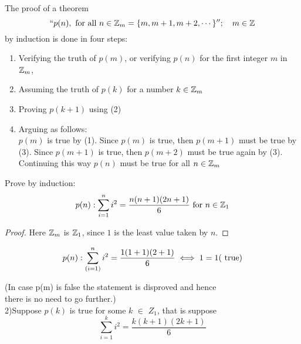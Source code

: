 \documentclass[11pt]{amsbook}
\begin{document}

The proof of a theorem
\[
	``p(n), 
	\text{ for all } 
	n \in \mathbb{Z}_{m} = \{ m, m + 1, m + 2, \cdots \}''; 
	\quad
	m \in \mathbb{Z}
\]
by induction is done in four steps:
\begin{enumerate}

	\item 
	Verifying the truth of $p(m)$, 
	or verifying $p(n)$ for the first integer $m$ in $\mathbb{Z}_{m}$,

	\item 
	Assuming the truth of $p(k)$ for a number $k \in \mathbb{Z}_{m}$

	\item 
	Proving $p(k+1)$ using (2)

	\item 
	Arguing as follows:\\
	$p(m)$ is true by (1).
	Since $p(m)$ is true, 
	then $p(m+1)$ must be true by (3).
	Since $p(m+1)$ is true, 
	then $p(m+2)$ must be true again by (3).
	Continuing this way $p(n)$ must be true for all $n \in \mathbb{Z}_{m}$
\end{enumerate}

\begin{exmp} 
	Prove by induction:
	\[
		p(n): 
		\sum_{i = 1}^{n} i^{2}
		= \frac{n(n+1)(2n+1)}{6} 
		\text{ for }
		n \in \mathbb{Z}_{1}
	\]
\end{exmp}
\begin{proof}
	Here $\mathbb{Z}_{m}$ is $\mathbb{Z}_{1}$, 
	since $1$ is the least value taken by $n$.
 
\end{proof}

\begin{equation*} 
p(n):\sum^n_{(i=1)} i^2=\frac{1(1+1)(2+1)}{6} \iff 1=1 (\text{ true})  \\
\end{equation*}

(In case p(m) is false the statement is disproved and hence\\
there is no need to go further.)\\

2)Suppose $p(k)$ is true for some $k$ $\in$ $Z_1$, that is suppose\\

\begin{equation*}
\sum^k_{i=1} i^2=\frac{k(k+1)(2k+1)}{6}
\end{equation*}
\end{document}
